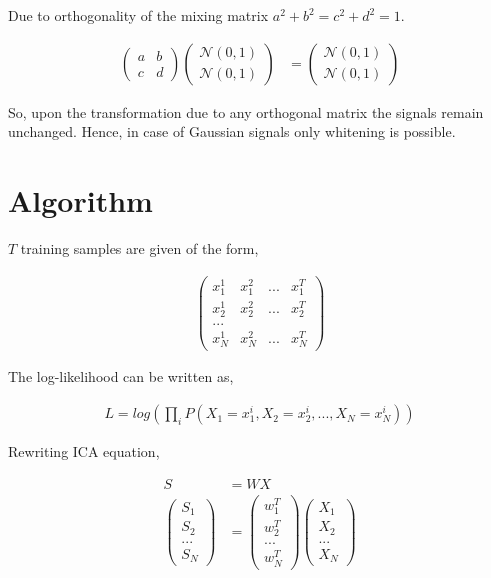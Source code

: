 \documentclass[11pt, a4paper]{article}
\begin{document}
Due to orthogonality of the mixing matrix $a^2+b^2=c^2+d^2=1$.

\begin{align*}
	\begin{pmatrix} 
	a & b                 \\ 
	c & d                 
	\end{pmatrix}
	\begin{pmatrix} 
	\mathcal{N}(0, 1) \\ 
	\mathcal{N}(0, 1) 
	\end{pmatrix} 
	  & = \begin{pmatrix} 
	\mathcal{N}(0, 1) \\ 
	\mathcal{N}(0, 1) 
	\end{pmatrix} 
\end{align*}

So, upon the transformation due to any orthogonal matrix the signals remain unchanged. Hence, in case of Gaussian signals only whitening is possible. 

\section{Algorithm}

$T$ training samples are given of the form,

\begin{align*}
	\begin{pmatrix}
	x_1^1 & x_1^2 & ... & x_1^T \\
	x_2^1 & x_2^2 & ... & x_2^T \\
	... \\
	x_N^1 & x_N^2 & ... & x_N^T 
	\end{pmatrix}
\end{align*}

The log-likelihood can be written as,

\begin{align*}
	L = log \left( \prod_i P(X_1 = x_1^i, X_2=x_2^i, ..., X_N=x_N^i) \right) 
\end{align*}

Rewriting ICA equation,

\begin{align*}
	S   &= WX              \\
	\begin{pmatrix} S_1 \\ S_2 \\ ... \\S_N \end{pmatrix} &= \begin{pmatrix} w_1^T \\ w_2^T \\ ... \\  w_N^T \end{pmatrix} \begin{pmatrix} X_1 \\ X_2 \\... \\  X_N \end{pmatrix}  \\
\end{align*}
\end{document}
